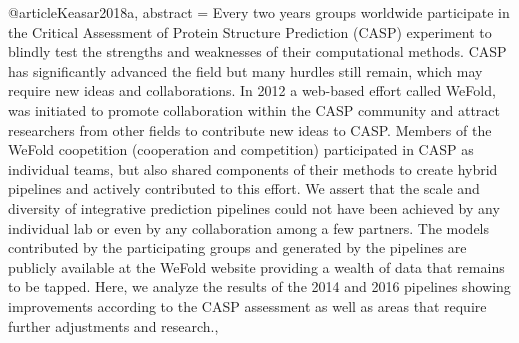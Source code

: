 @article{Keasar2018a,
abstract = {Every two years groups worldwide participate in the Critical Assessment of Protein Structure Prediction (CASP) experiment to blindly test the strengths and weaknesses of their computational methods. CASP has significantly advanced the field but many hurdles still remain, which may require new ideas and collaborations. In 2012 a web-based effort called WeFold, was initiated to promote collaboration within the CASP community and attract researchers from other fields to contribute new ideas to CASP. Members of the WeFold coopetition (cooperation and competition) participated in CASP as individual teams, but also shared components of their methods to create hybrid pipelines and actively contributed to this effort. We assert that the scale and diversity of integrative prediction pipelines could not have been achieved by any individual lab or even by any collaboration among a few partners. The models contributed by the participating groups and generated by the pipelines are publicly available at the WeFold website providing a wealth of data that remains to be tapped. Here, we analyze the results of the 2014 and 2016 pipelines showing improvements according to the CASP assessment as well as areas that require further adjustments and research.},
}
